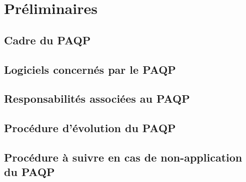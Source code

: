 
\section{Préliminaires}
    \subsection{Cadre du PAQP}

    \subsection{Logiciels concernés par le PAQP}

    \subsection{Responsabilités associées au PAQP}

    \subsection{Procédure d'évolution du PAQP}

    \subsection{Procédure à  suivre en cas de non-application du PAQP}
